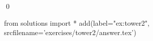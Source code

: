 
\begin{ex} 
  \label{ex:tower2}
  
  \qed
\end{ex} 
\begin{python0}
from solutions import *
add(label="ex:tower2",
    srcfilename='exercises/tower2/answer.tex') 
\end{python0}
